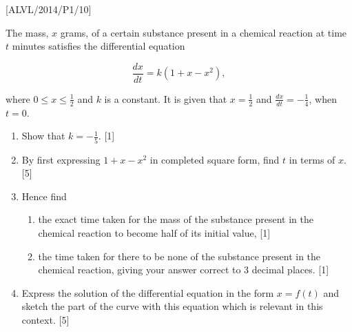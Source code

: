 \item {[}ALVL/2014/P1/10{]}

The mass, $x$ grams, of a certain substance present in a chemical
reaction at time $t$ minutes satisfies the differential equation 

\[
\frac{dx}{dt}=k\left(1+x-x^{2}\right),
\]
 

where $0\leq x\leq\frac{1}{2}$ and $k$ is a constant. It is given
that $x=\frac{1}{2}$ and $\frac{dx}{dt}=-\frac{1}{4}$, when $t=0$. 
\begin{enumerate}
\item Show that $k=-\frac{1}{5}$. \hfill{}{[}1{]}
\item By first expressing $1+x-x^{2}$ in completed square form, find $t$
in terms of $x$. \hfill{}{[}5{]}
\item Hence find 
\begin{enumerate}
\item the exact time taken for the mass of the substance present in the
chemical reaction to become half of its initial value, \hfill{}{[}1{]}
\item the time taken for there to be none of the substance present in the
chemical reaction, giving your answer correct to 3 decimal places.
\hfill{}{[}1{]}
\end{enumerate}
\item Express the solution of the differential equation in the form $x=f\left(t\right)$
and sketch the part of the curve with this equation which is relevant
in this context.\hfill{} {[}5{]}
\end{enumerate}
